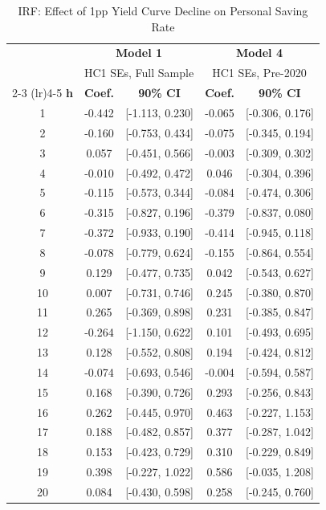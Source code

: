 \begin{table}[htbp]
\centering\small
\caption{IRF: Effect of 1pp Yield Curve Decline on Personal Saving Rate}
\label{tab:irf_exp2}
\begin{tabular}{c cccc}
\toprule
 & \multicolumn{2}{c}{\textbf{Model 1}} & \multicolumn{2}{c}{\textbf{Model 4}} \\
 & \multicolumn{2}{c}{HC1 SEs, Full Sample} & \multicolumn{2}{c}{HC1 SEs, Pre-2020} \\
\cmidrule(lr){2-3} \cmidrule(lr){4-5}
\textbf{h} & \textbf{Coef.} & \textbf{90\% CI} & \textbf{Coef.} & \textbf{90\% CI} \\
\midrule
1 & -0.442 & [-1.113, 0.230] & -0.065 & [-0.306, 0.176] \\
2 & -0.160 & [-0.753, 0.434] & -0.075 & [-0.345, 0.194] \\
3 & 0.057 & [-0.451, 0.566] & -0.003 & [-0.309, 0.302] \\
4 & -0.010 & [-0.492, 0.472] & 0.046 & [-0.304, 0.396] \\
5 & -0.115 & [-0.573, 0.344] & -0.084 & [-0.474, 0.306] \\
6 & -0.315 & [-0.827, 0.196] & -0.379 & [-0.837, 0.080] \\
7 & -0.372 & [-0.933, 0.190] & -0.414 & [-0.945, 0.118] \\
8 & -0.078 & [-0.779, 0.624] & -0.155 & [-0.864, 0.554] \\
9 & 0.129 & [-0.477, 0.735] & 0.042 & [-0.543, 0.627] \\
10 & 0.007 & [-0.731, 0.746] & 0.245 & [-0.380, 0.870] \\
11 & 0.265 & [-0.369, 0.898] & 0.231 & [-0.385, 0.847] \\
12 & -0.264 & [-1.150, 0.622] & 0.101 & [-0.493, 0.695] \\
13 & 0.128 & [-0.552, 0.808] & 0.194 & [-0.424, 0.812] \\
14 & -0.074 & [-0.693, 0.546] & -0.004 & [-0.594, 0.587] \\
15 & 0.168 & [-0.390, 0.726] & 0.293 & [-0.256, 0.843] \\
16 & 0.262 & [-0.445, 0.970] & 0.463 & [-0.227, 1.153] \\
17 & 0.188 & [-0.482, 0.857] & 0.377 & [-0.287, 1.042] \\
18 & 0.153 & [-0.423, 0.729] & 0.310 & [-0.229, 0.849] \\
19 & 0.398 & [-0.227, 1.022] & 0.586 & [-0.035, 1.208] \\
20 & 0.084 & [-0.430, 0.598] & 0.258 & [-0.245, 0.760] \\

\end{tabular}
\end{table}
